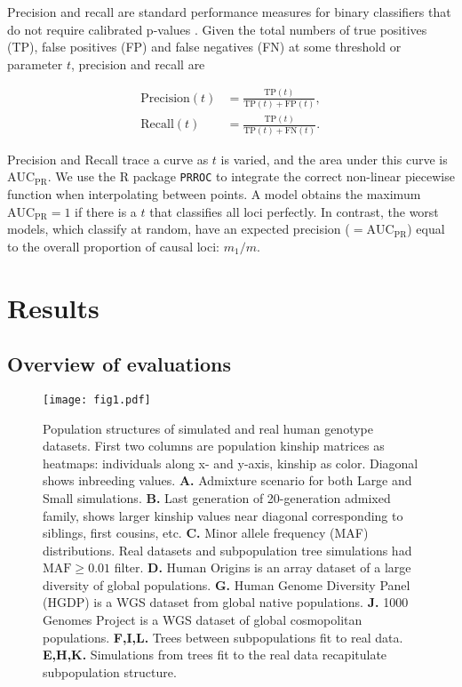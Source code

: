 \documentclass[9pt,lineno]{elife}
\newcommand{\auc}{\text{AUC}_\text{PR}}
\begin{document}
Precision and recall are standard performance measures for binary classifiers that do not require calibrated p-values \citep{grau_prroc:_2015}.
Given the total numbers of true positives (TP), false positives (FP) and false negatives (FN) at some threshold or parameter $t$, precision and recall are
\begin{linenomath*}
  \begin{align*}
    \text{Precision}(t)
    &=
      \frac{ \text{TP}(t) }{ \text{TP}(t) + \text{FP}(t) }
      , \\
    \text{Recall}(t)
    &=
      \frac{ \text{TP}(t) }{ \text{TP}(t) + \text{FN}(t) }
      .
  \end{align*}
\end{linenomath*}
Precision and Recall trace a curve as $t$ is varied, and the area under this curve is $\auc$.
We use the R package \texttt{PRROC} to integrate the correct non-linear piecewise function when interpolating between points.
A model obtains the maximum $\auc = 1$ if there is a $t$ that classifies all loci perfectly.
In contrast, the worst models, which classify at random, have an expected precision ($= \auc$) equal to the overall proportion of causal loci:
$m_1/m$.
\section{Results}

\subsection{Overview of evaluations}

\begin{figure}
  \begin{fullwidth}
    \texttt{[image: fig1.pdf]}
    \caption{
      Population structures of simulated and real human genotype datasets.
      First two columns are population kinship matrices as heatmaps: individuals along x- and y-axis, kinship as color.
      Diagonal shows inbreeding values.
      \textbf{A.}
      Admixture scenario for both Large and Small simulations.
      \textbf{B.}
      Last generation of 20-generation admixed family, shows larger kinship values near diagonal corresponding to siblings, first cousins, etc.
      \textbf{C.}
      Minor allele frequency (MAF) distributions.
      Real datasets and subpopulation tree simulations had $\text{MAF} \ge 0.01$ filter.
      \textbf{D.}
      Human Origins is an array dataset of a large diversity of global populations.
      \textbf{G.}
      Human Genome Diversity Panel (HGDP) is a WGS dataset from global native populations.
      \textbf{J.}
      1000 Genomes Project is a WGS dataset of global cosmopolitan populations.
      \textbf{F,I,L.}
      Trees between subpopulations fit to real data.
      \textbf{E,H,K.}
      Simulations from trees fit to the real data recapitulate subpopulation structure.
    }
    \label{fig:kinship}
  \end{fullwidth}
\end{figure}
\end{document}
